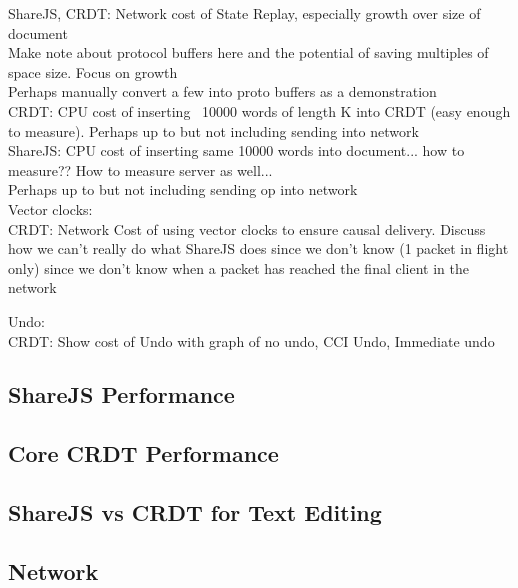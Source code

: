 \documentclass[12pt,a4paper,twoside,openright]{report}
\begin{document}
			ShareJS, CRDT: Network cost of State Replay, especially growth over size of document\\
							Make note about protocol buffers here and the potential of saving multiples of space size. Focus on growth	\\
							Perhaps manually convert a few into proto buffers as a demonstration\\
			
			
			CRDT: 	 CPU cost of inserting ~10000 words of length K into CRDT (easy enough to measure). Perhaps up to but not including sending into network\\
			ShareJS: CPU cost of inserting same 10000 words into document... how to measure?? How to measure server as well...\\
							Perhaps up to but not including sending op into network\\
			
			Vector clocks:\\
				CRDT: Network Cost of using vector clocks to ensure causal delivery. Discuss how we can't really do what ShareJS does since we don't know (1 packet in flight only) since we don't know when a packet has reached the final client in the network
							
			Undo:\\
				CRDT: Show cost of Undo with graph of no undo, CCI Undo, Immediate undo
				
							
							
			
			
			
	
		\subsection{ShareJS Performance}
		
			\subsubsection{}
		
		\subsection{Core CRDT Performance}
		
		\subsection{ShareJS vs CRDT for Text Editing}
		
		\subsection{Network}
		
\end{document}
